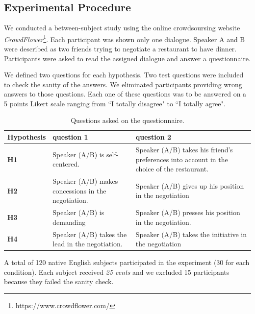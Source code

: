 \documentclass{llncs}
\begin{document}
			
			\subsection{Experimental Procedure}
			
			We conducted a between-subject study using the online crowdsoursing website \emph{CrowdFlower}\footnote{https://www.crowdflower.com/}. 
			Each participant was shown only one dialogue. Speaker A and B were described as two friends trying to negotiate a restaurant to have dinner. %
			Participants were asked to read the assigned dialogue and answer a questionnaire. 
			
			We defined two questions for each hypothesis. Two test questions were included to check the	sanity of the answers. We eliminated participants providing wrong answers to those questions. Each one of these questions was to be answered on a 5 points Likert scale ranging from ``I totally disagree" to ``I totally agree".
			
			\begin{table}[t]
				{\scriptsize
					\begin{tabular}{|p{1.75cm}|p{5cm}|p{5.5cm}|}
						\hline
						Hypothesis &question 1& question 2 \\
						\hline
						\textbf{H1} &Speaker (A/B) is self-centered. &Speaker (A/B) takes his friend's preferences into account in the choice of the restaurant.\\
						\hline
						\textbf{H2} &Speaker (A/B) makes concessions in the negotiation.&Speaker (A/B) gives up his position in the negotiation\\
						\hline
						\textbf{H3} & Speaker (A/B) is demanding&Speaker (A/B) presses his position in the negotiation. \\
						\hline
						\textbf{H4} &Speaker (A/B) takes the lead in the negotiation.&Speaker (A/B) takes the initiative in the negotiation \\
						\hline
					\end{tabular}
				}
				\caption{Questions asked on the questionnaire.}
				\label{table:questionnaire}
			\end{table}

			A total of 120 native English subjects participated in the experiment (30 for each condition). Each subject received \textit{25 cents} and we excluded 15 participants because they failed the sanity check.
			
\end{document}
